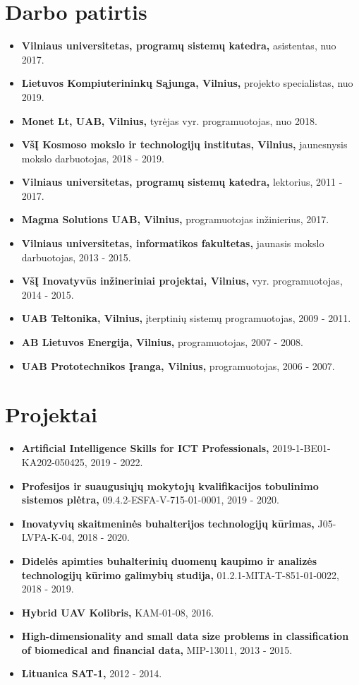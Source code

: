 \documentclass[a4paper,11pt]{article}
\newcommand{\resumeItem}[2]{
  \item\small{
    \textbf{#1}{ #2 \vspace{-2pt}}
  }
}
\newcommand{\resumeSubItem}[2]{\resumeItem{#1}{#2}\vspace{-4pt}}
\newcommand{\resumeSubHeadingListStart}{\begin{itemize}[leftmargin=*] \renewcommand\labelitemi{$\circ$}}
\newcommand{\resumeSubHeadingListEnd}{\end{itemize}}
\begin{document}
\section{Darbo patirtis}
  \resumeSubHeadingListStart
    \resumeSubItem{Vilniaus universitetas, programų sistemų katedra,}{asistentas, nuo 2017.}
    \resumeSubItem{Lietuvos Kompiuterininkų Sąjunga, Vilnius,}{projekto specialistas, nuo 2019.}
    \resumeSubItem{Monet Lt, UAB, Vilnius,}{tyrėjas vyr. programuotojas, nuo 2018.}
    \resumeSubItem{VšĮ Kosmoso mokslo ir technologijų institutas, Vilnius,}{jaunesnysis mokslo darbuotojas, 2018 - 2019.}
    \resumeSubItem{Vilniaus universitetas, programų sistemų katedra,}{lektorius, 2011 - 2017.}
    \resumeSubItem{Magma Solutions UAB, Vilnius,}{programuotojas inžinierius, 2017.}
    \resumeSubItem{Vilniaus universitetas, informatikos fakultetas,}{jaunasis mokslo darbuotojas, 2013 - 2015.}
    \resumeSubItem{VšĮ Inovatyvūs inžineriniai projektai, Vilnius,}{vyr. programuotojas, 2014 - 2015.}
    \resumeSubItem{UAB Teltonika, Vilnius,}{įterptinių sistemų programuotojas, 2009 - 2011.}
    \resumeSubItem{AB Lietuvos Energija, Vilnius,}{programuotojas, 2007 - 2008.}
    \resumeSubItem{UAB Prototechnikos Įranga, Vilnius,}{programuotojas, 2006 - 2007.}
  \resumeSubHeadingListEnd
\vspace{-15pt}
\section{Projektai}
  \resumeSubHeadingListStart
    \resumeSubItem{Artificial Intelligence Skills for ICT Professionals,}{2019-1-BE01-KA202-050425, 2019 - 2022.}
    \resumeSubItem{Profesijos ir suaugusiųjų mokytojų kvalifikacijos tobulinimo sistemos plėtra,}{09.4.2-ESFA-V-715-01-0001, 2019 - 2020.}
    \resumeSubItem{Inovatyvių skaitmeninės buhalterijos technologijų kūrimas,}{J05-LVPA-K-04, 2018 - 2020.}
    \resumeSubItem{Didelės apimties buhalterinių duomenų kaupimo ir analizės technologijų kūrimo galimybių studija,}{01.2.1-MITA-T-851-01-0022, 2018 - 2019.}
    \resumeSubItem{Hybrid UAV Kolibris,}{KAM-01-08, 2016.}
    \resumeSubItem{High-dimensionality and small data size problems in classification of biomedical and financial data,}{MIP-13011, 2013 - 2015.}
    \resumeSubItem{Lituanica SAT-1,}{2012 - 2014.}
  \resumeSubHeadingListEnd
\vspace{-15pt}
\end{document}
